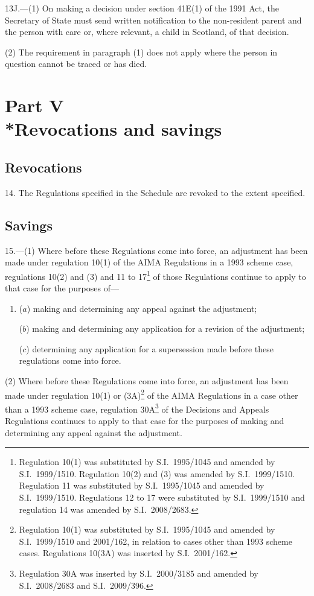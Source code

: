 \documentclass[12pt,a4paper]{article}
\begin{document}
13J.---(1)  On making a decision under section 41E(1) of the 1991 Act, the Secretary of State must send written notification to the non-resident parent and the person with care or, where relevant, a child in Scotland, of that decision.

(2) The requirement in paragraph (1) does not apply where the person in question cannot be traced or has died.

\section[Part V --- Revocations and savings]{Part V\\*Revocations and savings}

\renewcommand\parthead{--- Part V}

\subsection[14. Revocations]{Revocations}

14.  The Regulations specified in the Schedule are revoked to the extent specified.

\subsection[15. Savings]{Savings}

15.---(1)  Where before these Regulations come into force, an adjustment has been made under regulation 10(1) of the AIMA Regulations in a 1993 scheme case, regulations 10(2) and (3) and 11 to 17\footnote{Regulation 10(1) was substituted by S.I.~1995/1045 and amended by S.I.~1999/1510. Regulation 10(2) and (3) was amended by S.I.~1999/1510. Regulation 11 was substituted by S.I.~1995/1045 and amended by S.I.~1999/1510. Regulations 12 to 17 were substituted by S.I.~1999/1510 and regulation 14 was amended by S.I.~2008/2683.} of those Regulations continue to apply to that case for the purposes of—
\begin{enumerate}\item[]
($a$) making and determining any appeal against the adjustment;

($b$) making and determining any application for a revision of the adjustment;

($c$) determining any application for a supersession made before these regulations come into force.
\end{enumerate}

(2) Where before these Regulations come into force, an adjustment has been made under regulation 10(1) or (3A)\footnote{Regulation 10(1) was substituted by S.I.~1995/1045 and amended by S.I.~1999/1510 and 2001/162, in relation to cases other than 1993 scheme cases. Regulations 10(3A) was inserted by S.I.~2001/162.} of the AIMA Regulations in a case other than a 1993 scheme case, regulation 30A\footnote{Regulation 30A was inserted by S.I.~2000/3185 and amended by S.I.~2008/2683 and S.I.~2009/396.} of the Decisions and Appeals Regulations continues to apply to that case for the purposes of making and determining any appeal against the adjustment. 
\end{document}

